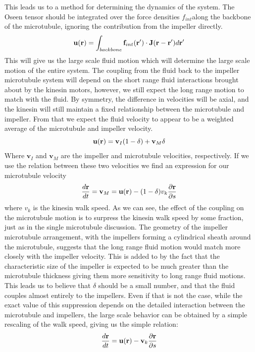 \documentclass[11pt]{ucthesis}
\def\br{{\bf r}}
\begin{document}
This leads us to a method for determining the dynamics of the system. The Oseen tensor should be integrated over the force densities $f_{int}$along the backbone of the microtubule, ignoring the contribution from the impeller directly. 
\begin{equation}
\label{eq:fluidvelocity}
\mathbf{u}(\br ) = \int_{backbone} \mathbf{f}_{int}(\br^\prime) \cdot \mathbf{J} (\br - \br^\prime) d\br^\prime
\end{equation}
This will give us the large scale fluid motion which will determine the large scale motion of the entire system. The coupling from the fluid back to the impeller microtubule system will depend on the short range fluid interactions brought about by the kinesin motors, however, we still expect the long range motion to match with the fluid. By symmetry, the difference in velocities will be axial, and the kinesin will still maintain a fixed relationship between the microtubule and impeller. From that we expect the fluid velocity to appear to be a weighted average of the microtubule and impeller velocity.
\begin{equation}
\label{eq:systemvelocity}
\mathbf{u}(\br) = \mathbf{v}_I(1-\delta) + \mathbf{v}_M \delta
\end{equation}
Where $\mathbf{v}_I$ and $\mathbf{v}_M$ are the impeller and microtubule velocities, respectively. If we use the relation between these two velocities we find an expression for our microtubule velocity
\begin{equation}
\label{eq:mtubevelocity}
\frac{d \br}{dt} = \mathbf{v}_M = \mathbf{u}(\br) - (1-\delta)v_k \frac{\partial \br}{\partial s}
\end{equation}
where $v_k$ is the kinesin walk speed. As we can see, the effect of the coupling on the microtubule motion is to surpress the kinesin walk speed by some fraction, just as in the single microtubule discussion. 
The geometry of the impeller microtubule arrangement, with the impellers forming a cylindrical sheath around the microtubule, suggests that the long range fluid motion would match more closely with the impeller velocity. This is added to by the fact that the characteristic size of the impeller is expected to be much greater than the microtubule thickness giving them more sensitivity to long range fluid motions.
This leads us to believe that $\delta$ should be a small number, and that the fluid couples almost entirely to the impellers.
Even if that is not the case, while the exact value of this suppression depends on the detailed interaction between the microtubule and impellers, the large scale behavior can be obtained by a simple rescaling of the walk speed, giving us the simple relation:
\begin{equation}
\label{eq:backbonevelocity}
\frac{d \br}{dt} = \mathbf{u}(\br ) - \mathbf{v}_k \frac{\partial \br}{\partial s}
\end{equation}
\end{document}
